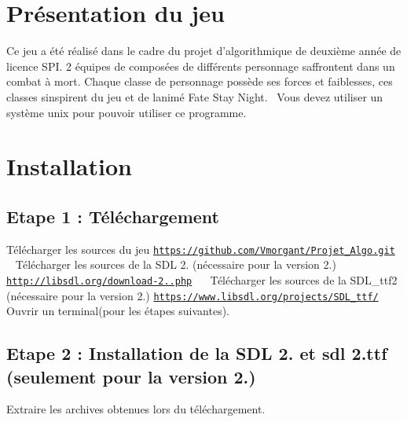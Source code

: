 \hypertarget{index_intro_sec}{}\section{Présentation du jeu}\label{index_intro_sec}
Ce jeu a été réalisé dans le cadre du projet d’algorithmique de deuxième année de licence S\+PI. 2 équipes de composées de différents personnage s\textquotesingle{}affrontent dans un combat à mort. Chaque classe de personnage possède ses forces et faiblesses, ces classes s\textquotesingle{}inspirent du jeu et de l\textquotesingle{}animé Fate Stay Night.~\newline
 Vous devez utiliser un système unix pour pouvoir utiliser ce programme.\hypertarget{index_install_sec}{}\section{Installation}\label{index_install_sec}
\hypertarget{index_step1}{}\subsection{Etape 1 \+: Téléchargement}\label{index_step1}
Télécharger les sources du jeu \href{https://github.com/Vmorgant/Projet_Algo.git}{\tt https\+://github.\+com/\+Vmorgant/\+Projet\+\_\+\+Algo.\+git}~\newline
~\newline
 Télécharger les sources de la S\+DL 2. (nécessaire pour la version 2.) \href{http://libsdl.org/download-2.0.php}{\tt http\+://libsdl.\+org/download-\/2..\+php}~\newline
~\newline
 Télécharger les sources de la S\+D\+L\+\_\+ttf2 (nécessaire pour la version 2.) \href{https://www.libsdl.org/projects/SDL_ttf/}{\tt https\+://www.\+libsdl.\+org/projects/\+S\+D\+L\+\_\+ttf/}~\newline
~\newline
 Ouvrir un terminal(pour les étapes suivantes).~\newline
~\newline
\hypertarget{index_step2}{}\subsection{Etape 2 \+: Installation de la S\+D\+L 2. et sdl 2.\+ttf (seulement pour la version 2.)}\label{index_step2}
Extraire les archives obtenues lors du téléchargement.~\newline
~\newline
